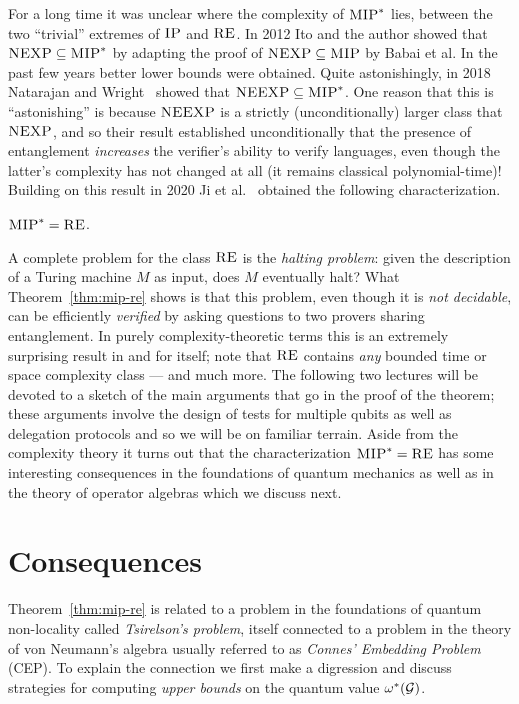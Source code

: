 For a long time it was unclear where the complexity of $\textsc{MIP}^*$ lies, between the two ``trivial'' extremes of $\textsc{IP}$ and $\textsc{RE}$. In 2012 Ito and the author showed that $\textsc{NEXP} \subseteq \textsc{MIP}^*$ by adapting the proof of $\textsc{NEXP} \subseteq \textsc{MIP}$ by Babai et al. In the past few years better lower bounds were obtained. Quite astonishingly, in 2018 Natarajan and Wright~\cite{natarajan2019neexp} showed that $\textsc{NEEXP} \subseteq \textsc{MIP}^*$. One reason that this is ``astonishing'' is because $\textsc{NEEXP}$ is a strictly (unconditionally) larger class that $\textsc{NEXP}$, and so their result established unconditionally that the presence of entanglement \emph{increases} the verifier's ability to verify languages, even though the latter's complexity has not changed at all (it remains classical polynomial-time)! Building on this result in 2020 Ji et al.~\cite{ji2021mip} obtained the following characterization. 

\begin{theorem}\label{thm:mip-re}
$\textsc{MIP}^* = \textsc{RE}$. 
\end{theorem}

A complete problem for the class $\textsc{RE}$ is the \emph{halting problem}: given the description of a Turing machine $M$ as input, does $M$ eventually halt? What Theorem~\ref{thm:mip-re} shows is that this problem, even though it is \emph{not decidable}, can be efficiently \emph{verified} by asking questions to two provers sharing entanglement. In purely complexity-theoretic terms this is an extremely surprising result in and for itself; note that $\textsc{RE}$ contains \emph{any} bounded time or space complexity class --- and much more. The following two lectures will be devoted to a sketch of the main arguments that go in the proof of the theorem; these arguments involve the design of tests for multiple qubits as well as delegation protocols and so we will be on familiar terrain. Aside from the complexity theory it turns out that the characterization $\textsc{MIP}^* = \textsc{RE}$ has some interesting consequences in the foundations of quantum mechanics as well as in the theory of operator algebras which we discuss next. 

\section{Consequences}

Theorem~\ref{thm:mip-re} is related to a problem in the foundations of quantum non-locality called \emph{Tsirelson's problem}, itself connected to a problem in the theory of von Neumann's algebra usually referred to as \emph{Connes' Embedding Problem} (CEP). To explain the connection we first make a digression and discuss strategies for computing \emph{upper bounds} on the quantum value $\omega^*(\mathcal{G})$.





